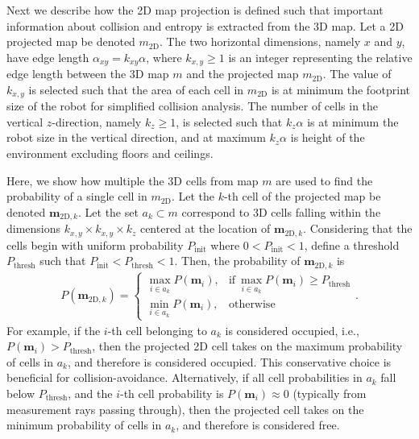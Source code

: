\documentclass[smallextended]{svjour3}       %
\begin{document}
Next we describe how the 2D map projection is defined such that important information about collision and entropy is extracted from the 3D map. Let a 2D projected map be denoted $m_\text{2D}$. The two horizontal dimensions, namely $x$ and $y$, have edge length $\alpha_{xy}=k_{xy}\alpha$, where $k_{x,y}\geq1$ is an integer representing the relative edge length between the 3D map $m$ and the projected map $m_\text{2D}$. The value of $k_{x,y}$ is selected such that the area of each cell in $m_\text{2D}$ is at minimum the footprint size of the robot for simplified collision analysis. The number of cells in the vertical $z$-direction, namely $k_z\geq1$, is selected such that $k_z\alpha$ is at minimum the robot size in the vertical direction, and at maximum $k_z\alpha$ is height of the environment excluding floors and ceilings. 

Here, we show how multiple the 3D cells from map $m$ are used to find the probability of a single cell in $m_\text{2D}$. 
Let the $k$-th cell of the projected map be denoted $\mathbf{m}_{\text{2D},k}$. Let the set $a_k\subset m$ correspond to 3D cells falling within the dimensions $k_{x,y}\times k_{x,y}\times k_z$ centered at the location of $\mathbf{m}_{\text{2D},k}$. Considering that the cells begin with uniform probability $P_\text{init}$ where $0<P_\text{init}<1$, define a threshold $P_\text{thresh}$ such that $P_\text{init}<P_\text{thresh}<1$. Then, the probability of $\mathbf{m}_{\text{2D},k}$ is
\begin{align}
\label{eqn:Proj2DMapComb}
P(\mathbf{m}_{\text{2D},k})= 
\begin{cases}
    \max_{i\in a_k}{P(\mathbf{m}_i)},			&\text{if} \ \max_{i\in a_k}{P(\mathbf{m}_i)}\geq P_\text{thresh}\\
    \min_{i\in a_k}{P(\mathbf{m}_i)},              & \text{otherwise}
\end{cases}.
\end{align}
For example, if the $i$-th cell belonging to $a_k$ is considered occupied, i.e., $P(\mathbf{m}_i)>P_\text{thresh}$, then the projected 2D cell takes on the maximum probability of cells in $a_k$, and therefore is considered occupied. This conservative choice is beneficial for collision-avoidance. Alternatively, if all cell probabilities in $a_k$ fall below $P_\text{thresh}$, and the $i$-th cell probability is $P(\mathbf{m}_i)\approx0$ (typically from measurement rays passing through), then the projected cell takes on the minimum probability of cells in $a_k$, and therefore is considered free.
\end{document}
